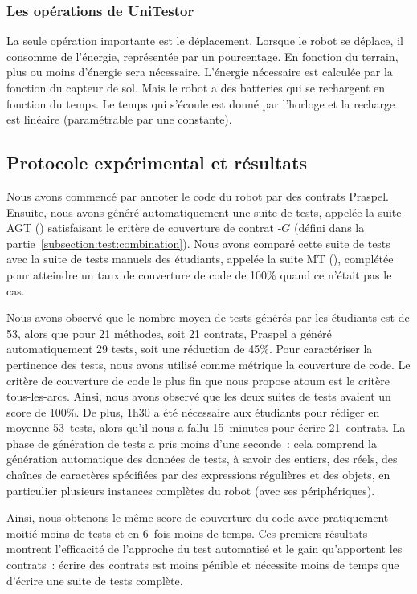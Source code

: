 \subsubsection{Les opérations de UniTestor}

La seule opération importante est le déplacement. Lorsque le robot se déplace,
il consomme de l'énergie, représentée par un pourcentage. En fonction du
terrain, plus ou moins d'énergie sera nécessaire. L'énergie nécessaire est
calculée par la fonction  du capteur de sol. Mais le robot
a des batteries qui se rechargent en fonction du temps. Le temps qui s'écoule
est donné par l'horloge et la recharge est linéaire (paramétrable par une
constante).

\subsection{Protocole expérimental et résultats}

Nous avons commencé par annoter le code du robot par des contrats Praspel.
Ensuite, nous avons généré automatiquement une suite de tests, appelée la suite
AGT () satisfaisant le critère de
couverture de contrat -$G$ (défini dans la
partie~\ref{subsection:test:combination}). Nous avons comparé cette suite de
tests avec la suite de tests manuels des étudiants, appelée la suite MT
(), complétée pour atteindre un taux de couverture de
code de 100\% quand ce n'était pas le cas.

Nous avons observé que le nombre moyen de tests générés par les étudiants est de
53, alors que pour 21 méthodes, soit 21 contrats, Praspel a généré
automatiquement 29 tests, soit une réduction de 45\%. Pour caractériser la
pertinence des tests, nous avons utilisé comme métrique la couverture de code.
Le critère de couverture de code le plus fin que nous propose atoum est le
critère tous-les-arcs. Ainsi, nous avons observé que les deux suites de tests
avaient un score de 100\%. De plus, 1h30 a été nécessaire aux étudiants pour
rédiger en moyenne 53~tests, alors qu'il nous a fallu 15~minutes pour écrire
21~contrats.  La phase de génération de tests a pris moins d'une seconde~: cela
comprend la génération automatique des données de tests, à savoir des entiers,
des réels, des chaînes de caractères spécifiées par des expressions régulières
et des objets, en particulier plusieurs instances complètes du robot (avec ses
périphériques).

Ainsi, nous obtenons le même score de couverture du code avec pratiquement
moitié moins de tests et en 6~fois moins de temps. Ces premiers résultats
montrent l'efficacité de l'approche du test automatisé et le gain qu'apportent
les contrats~: écrire des contrats est moins pénible et nécessite moins de temps
que d'écrire une suite de tests complète.


